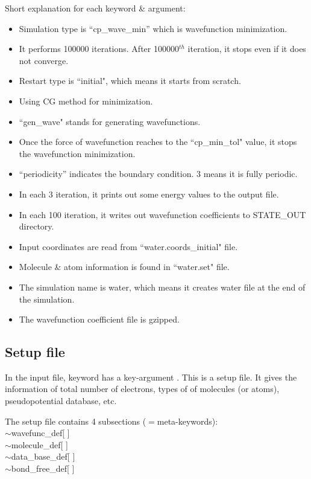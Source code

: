 \documentclass[letterpaper,12pt]{article}
\begin{document}
Short explanation for each keyword \& argument:
\begin{itemize}
\item Simulation type is ``cp\_wave\_min'' which is wavefunction minimization.
\item It performs 100000 iterations. After 100000$^{th}$ iteration, it stops even if it does not converge.
\item Restart type is ``initial", which means it starts from scratch.
\item Using CG method for minimization.
\item ``gen\_wave" stands for generating wavefunctions.
\item Once the force of wavefunction reaches to the ``cp\_min\_tol" value, it stops the wavefunction minimization.
\item ``periodicity'' indicates the boundary condition. 3 means it is fully periodic.
\item In each 3 iteration, it prints out some energy values to the output file.
\item In each 100 iteration, it writes out wavefunction coefficients to STATE\_OUT directory.
\item Input coordinates are read from ``water.coords\_initial" file.
\item Molecule \& atom information is found in ``water.set" file.
\item The simulation name is water, which means it creates water file at the end of the simulation.
\item The wavefunction coefficient file is gzipped.
\end{itemize}


\subsection{Setup file}
In the input file, keyword {\selectfont{\textbackslash mol\_set\_file} }has a key-argument {\selectfont{water.set}}. This is a setup file. It gives the information of total number of electrons, types of of molecules (or atoms), pseudopotential database, etc.

The setup file contains 4 subsections ($=$meta-keywords):\\
{\selectfont
$\sim$wavefunc\_def[ ]\\
$\sim$molecule\_def[ ]\\
$\sim$data\_base\_def[ ]\\
$\sim$bond\_free\_def[ ]\\
}
\end{document}
